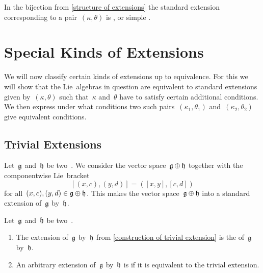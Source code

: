 \begin{definition}
	In the bijection from \cref{structure of extensions} the standard extension corresponding to a pair~$(\kappa, \theta)$ is , or simple .
\end{definition}





\section{Special Kinds of Extensions}


\begin{fluff}
	We will now classify certain kinds of extensions up to equivalence.
	For this we will show that the Lie~algebras in question are equivalent to standard extensions given by~$(\kappa, \theta)$ such that~$\kappa$ and~$\theta$ have to satisfy certain additional conditions.
	We then express under what conditions two such pairs~$(\kappa_1, \theta_1)$ and~$(\kappa_2, \theta_2)$ give equivalent conditions.
\end{fluff}



\subsection{Trivial Extensions}


\begin{example}
	\label{construction of trivial extension}
	Let~$\mathfrak{g}$ and~$\mathfrak{h}$ be two~\liealgebras{$\kf$}.
	We consider the vector space~$\mathfrak{g} \oplus \mathfrak{h}$ together with the componentwise Lie~bracket
	\[
		[ (x,c), (y,d) ]
		=
		( [x,y], [c,d] )
	\]
	for all~$(x,c), (y,d) \in \mathfrak{g} \oplus \mathfrak{h}$.
	This makes the vector space~$\mathfrak{g} \oplus \mathfrak{h}$ into a standard extension of~$\mathfrak{g}$ by~$\mathfrak{h}$.
\end{example}


\begin{definition}
	Let~$\mathfrak{g}$ and~$\mathfrak{h}$ be two~\liealgebras{$\kf$}.
	\begin{enumerate}
		\item
			The extension of~$\mathfrak{g}$ by~$\mathfrak{h}$ from \cref{construction of trivial extension} is the  of~$\mathfrak{g}$ by~$\mathfrak{h}$.
		\item
			An arbitrary extension of~$\mathfrak{g}$ by~$\mathfrak{h}$ is  if it is equivalent to the trivial extension.
	\end{enumerate}
\end{definition}


